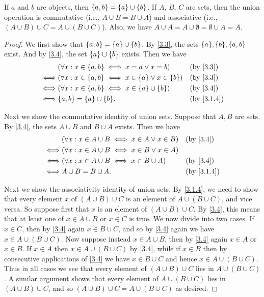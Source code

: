 \begin{lem}\label{3.1.13}
	If \(a\) and \(b\) are objects, then \(\left\lbrace a, b\right\rbrace = \left\lbrace a\right\rbrace \cup \left\lbrace b\right\rbrace\).
	If \(A\), \(B\), \(C\) are sets, then the union operation is commutative (i.e., \(A \cup B = B \cup A\)) and associative (i.e., \((A \cup B) \cup C = A \cup (B \cup C)\)).
	Also, we have \(A \cup A = A \cup \emptyset = \emptyset \cup A = A\).
\end{lem}

\begin{proof}
	We first show that \(\left\lbrace a, b\right\rbrace = \left\lbrace a\right\rbrace \cup \left\lbrace b\right\rbrace\).
	By \cref{3.3}, the sets \(\set{a}, \set{b}, \set{a, b}\) exist.
	And by \cref{3.4}, the set \(\left\lbrace a\right\rbrace \cup \left\lbrace b\right\rbrace\) exists.
	Then we have
	\begin{align*}
		     & (\forall x : x \in \set{a, b} \iff x = a \lor x = b)                 &  & \by{3.3}   \\
		\iff & (\forall x : x \in \set{a, b} \iff x \in \set{a} \lor x \in \set{b}) &  & \by{3.3}   \\
		\iff & (\forall x : x \in \set{a, b} \iff x \in \set{a} \cup \set{b})       &  & \by{3.4}   \\
		\iff & \set{a, b} = \set{a} \cup \set{b}.                                   &  & \by{3.1.4}
	\end{align*}

	Next we show the commutative identity of union sets.
	Suppose that \(A, B\) are sets.
	By \cref{3.4}, the sets \(A \cup B\) and \(B \cup A\) exists.
	Then we have
	\begin{align*}
		     & (\forall x : x \in A \cup B \iff x \in A \lor x \in B) &  & \by{3.4}   \\
		\iff & (\forall x : x \in A \cup B \iff x \in B \lor x \in A)                 \\
		\iff & (\forall x : x \in A \cup B \iff x \in B \cup A)       &  & \by{3.4}   \\
		\iff & A \cup B = B \cup A.                                   &  & \by{3.1.4}
	\end{align*}

	Next we show the associativity identity of union sets.
	By \cref{3.1.4}, we need to show that every element \(x\) of \((A \cup B) \cup C\) is an element of \(A \cup (B \cup C)\), and vice versa.
	So suppose first that \(x\) is an element of \((A \cup B) \cup C\).
	By \cref{3.4}, this means that at least one of \(x \in A \cup B\) or \(x \in C\) is true.
	We now divide into two cases.
	If \(x \in C\), then by \cref{3.4} again \(x \in B \cup C\), and so by \cref{3.4} again we have \(x \in A \cup (B \cup C)\).
	Now suppose instead \(x \in A \cup B\), then by \cref{3.4} again \(x \in A\) or \(x \in B\).
	If \(x \in A\) then \(x \in A \cup (B \cup C)\) by \cref{3.4}, while if \(x \in B\) then by consecutive applications of \cref{3.4} we have \(x \in B \cup C\) and hence \(x \in A \cup (B \cup C)\).
	Thus in all cases we see that every element of \((A \cup B) \cup C\) lies in \(A \cup (B \cup C)\).
	A similar argument shows that every element of \(A \cup (B \cup C)\) lies in \((A \cup B) \cup C\), and so \((A \cup B) \cup C = A \cup (B \cup C) \) as desired.


\end{proof}
